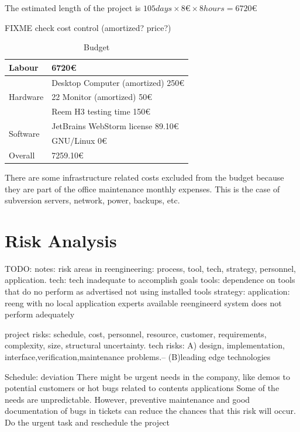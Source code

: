 \FloatBarrier

\label{sec:budget}
The estimated length of the project is $105 days \times 8 \euro{} \times 8 hours = 6720 \euro{} $

FIXME check cost control (amortized? price?)

\begin{table}[ht]
    \centering
    \caption{Budget}
    \label{tab:budget}
    \begin{tabular}{| l | l |}
    \hline
    Labour & 6720\euro{} \\ \hline
    \multirow{3}{*}{Hardware} 
        & Desktop Computer (amortized) 250\euro{} \\ %
        & 22 Monitor (amortized) 50\euro{} \\
        & Reem H3 testing time 150\euro{} \\ \hline   
    \multirow{2}{*}{Software}
        & JetBrains WebStorm license 89.10\euro{} \\ %
        & GNU/Linux 0\euro{} \\ \hline
     Overall & 7259.10\euro{} \\ 
     \hline
    \end{tabular}
\end{table}

There are some infrastructure related costs excluded from the budget because they are part of the office maintenance monthly expenses.
This is the case of subversion servers, network, power, backups, etc. 

\section{Risk Analysis}
TODO: notes: risk areas in reengineering: process, tool,  tech, strategy, personnel, application.
tech:  tech inadequate to accomplish goals
tools: dependence on tools that do no perform as advertised
not using installed tools
strategy: 
application: reeng with no local application experts available 
reengineerd system does not perform adequately

project risks: schedule, cost, personnel, resource, customer, requirements, complexity, size, structural uncertainty. 
tech risks: A) design, implementation, interface,verification,maintenance problems.– (B)leading edge technologies

\label{sec:risk}
\begin{risk}
{Schedule: deviation}
{There might be urgent needs in the company, like demos to potential customers or hot bugs related to contents applications}
{Some of the needs are unpredictable. However, preventive maintenance and good documentation of bugs in tickets can reduce the chances that this risk will occur.}
{Do the urgent task and reschedule the project}
\end{risk}

